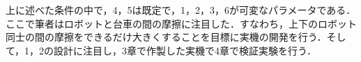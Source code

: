 上に述べた条件の中で，4，5は既定で，1，2，3，6が可変なパラメータである．ここで筆者はロボットと台車の間の摩擦に注目した．すなわち，上下のロボット同士の間の摩擦をできるだけ大きくすることを目標に実機の開発を行う．そして，1，2の設計に注目し，3章で作製した実機で4章で検証実験を行う．


